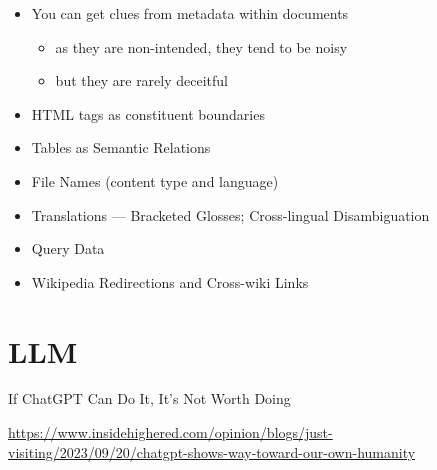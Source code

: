 \documentclass[a4paper,landscape,headrule,footrule,xetex]{foils}
\begin{document}
\begin{itemize}
\item You can get clues from metadata within documents
  \begin{itemize}
  \item as they are non-intended, they tend to be noisy
  \item but they are rarely deceitful
  \end{itemize}
\item HTML tags as constituent boundaries
\item Tables as Semantic Relations
\item File Names (content type and language)
\item Translations ---  Bracketed Glosses;  Cross-lingual Disambiguation
\item Query Data
\item Wikipedia Redirections and Cross-wiki Links
\end{itemize}

\section{LLM}


\begin{frame}{If ChatGPT Can Do It, It’s Not Worth Doing}

  \url{https://www.insidehighered.com/opinion/blogs/just-visiting/2023/09/20/chatgpt-shows-way-toward-our-own-humanity}
  
\end{frame}

\end{document}
